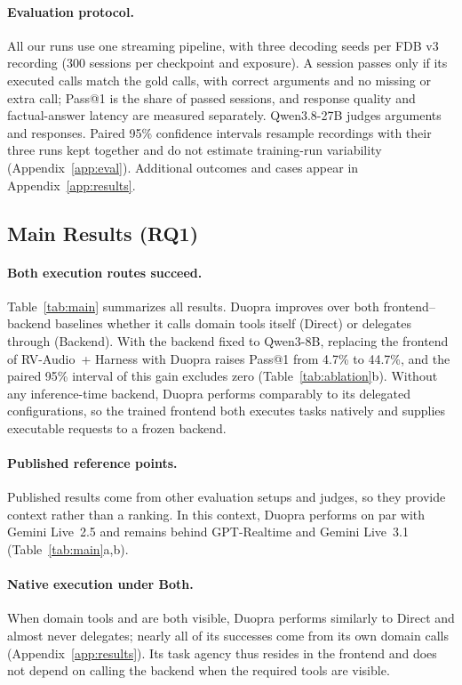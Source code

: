 \paragraph{Evaluation protocol.}
All our runs use one streaming pipeline, with three decoding seeds per FDB v3 recording (300 sessions per checkpoint and exposure).
A session passes only if its executed calls match the gold calls, with correct arguments and no missing or extra call; Pass@1 is the share of passed sessions, and response quality and factual-answer latency are measured separately.
Qwen3.8-27B judges arguments and responses.
Paired 95\% confidence intervals resample recordings with their three runs kept together and do not estimate training-run variability (Appendix~\ref{app:eval}).
Additional outcomes and cases appear in Appendix~\ref{app:results}.

\subsection{Main Results (RQ1)}
\label{sec:overall}

\paragraph{Both execution routes succeed.}
Table~\ref{tab:main} summarizes all results.
Duopra improves over both frontend--backend baselines whether it calls domain tools itself (Direct) or delegates through  (Backend).
With the backend fixed to Qwen3-8B, replacing the frontend of RV-Audio~+ Harness with Duopra raises Pass@1 from 4.7\% to 44.7\%, and the paired 95\% interval of this gain excludes zero (Table~\ref{tab:ablation}b).
Without any inference-time backend, Duopra performs comparably to its delegated configurations, so the trained frontend both executes tasks natively and supplies executable requests to a frozen backend.

\paragraph{Published reference points.}
Published results come from other evaluation setups and judges, so they provide context rather than a ranking.
In this context, Duopra performs on par with Gemini Live~2.5 and remains behind GPT-Realtime and Gemini Live~3.1 (Table~\ref{tab:main}a,b).

\paragraph{Native execution under Both.}
When domain tools and  are both visible, Duopra performs similarly to Direct and almost never delegates; nearly all of its successes come from its own domain calls (Appendix~\ref{app:results}).
Its task agency thus resides in the frontend and does not depend on calling the backend when the required tools are visible.

